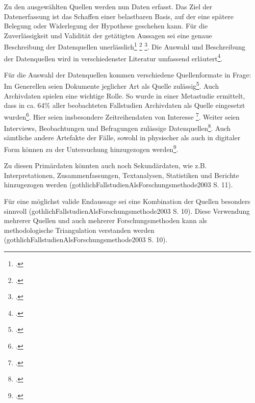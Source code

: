 Zu den ausgewählten Quellen werden nun Daten erfasst. Das Ziel der
Datenerfassung ist das Schaffen einer belastbaren Basis, auf der eine
spätere Belegung oder Widerlegung der Hypothese geschehen kann. Für die
Zuverlässigkeit und Validität der getätigten Aussagen sei eine genaue
Beschreibung der Datenquellen unerlässlich\footcite[Vgl. ][]{(dubeRigorInformationSystems2003
  S. 612)} \footcite[Vgl. ][]{1. (p. 381) (dubeRigorInformationSystems2003 S.
  614)} \footcite[Vgl. ][]{Benbasat et al.'s (1987)}. Die Auswahl und
Beschreibung der Datenquellen wird in verschiedenster Literatur
umfassend erläutert\footcite[Vgl. ][]{(gothlichFallstudienAlsForschungsmethode2003
  S. 10); Girtler, Roland (2001): Methoden der Feldforschung, 4., völlig
  neu bearbeitete Auflage, Wien, Köln, Weimar; Lueger, Manfred (2000):
  Grundlagen qualitativer Feldforschung, Me-thodologie, Organisierung,
  Materialanalyse, Wien; Piore, Michael J. (1979): 'Qualitative Research
  Techniques in Econom-ics', in: Administrative Science Quarterly, Vol.
  24 (1979), No. 4, S. 560-569.}.

  Für die Auswahl der Datenquellen kommen verschiedene Quellenformate in
Frage: Im Generellen seien Dokumente jeglicher Art als Quelle
zulässig\footcite[Vgl. ][]{(gothlichFallstudienAlsForschungsmethode2003 S.10)}.
Auch Archivdaten spielen eine wichtige Rolle. So wurde in einer
Metastudie ermittelt, dass in ca. 64\% aller beobachteten Fallstudien
Archivdaten als Quelle eingesetzt wurden\footcite[Vgl. ][]{(dubeRigorInformationSystems2003
  S. 614)}. Hier seien insbesondere Zeitreihendaten von Interesse
\footcite[Vgl. ][]{i. (Benbasatet al. 1987; Eisenhardt1989).
  (dubeRigorInformationSystems2003 S. 612)}. Weiter seien Interviews,
Beobachtungen und Befragungen zulässige Datenquellen\footcite[Vgl. ][]{(Benbasatet
  al. 1987; Eisenhardt1989). (dubeRigorIn-formationSys-tems2003 S. 612),
  Yin(1994)}. Auch sämtliche andere Artefakte der Fälle, sowohl in
physischer als auch in digitaler Form können zu der Untersuchung
hinzugezogen werden\footcite[Vgl. ][]{a.
  (gothlichFallstudienAlsForschungsmethode2003 S.10);
  (dubeRigorInformationSystems2003 S. 612); Yin(1994)}.

Zu diesen Primärdaten könnten auch noch Sekundärdaten, wie z.B.
Interpretationen, Zusammenfassungen, Textanalysen, Statistiken und
Berichte hinzugezogen werden
(gothlichFallstudienAlsForschungsmethode2003 S. 11).

Für eine möglichst valide Endaussage sei eine Kombination der Quellen
besonders sinnvoll (gothlichFallstudienAlsForschungsmethode2003 S. 10).
Diese Verwendung mehrerer Quellen und auch mehrerer Forschungsmethoden
kann als methodologische Triangulation verstanden werden
(gothlichFallstudienAlsForschungsmethode2003 S. 10).

